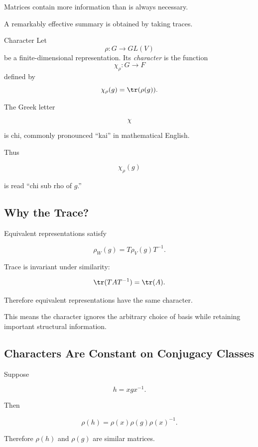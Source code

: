 Matrices contain more information than is always necessary.

A remarkably effective summary is obtained by taking traces.

\begin{definitionbox}{Character}
Let
\[ \rho:G\to GL(V) \]
be a finite-dimensional representation. Its \emph{character} is the function
\[ \chi_\rho:G\to F \]
defined by
\[ \chi_\rho(g)=\tr(\rho(g)). \]
\end{definitionbox}

The Greek letter

\[ \chi \]

is chi, commonly pronounced ``kai'' in mathematical English.

Thus

\[ \chi_\rho(g) \]

is read ``chi sub rho of \(g\).''

\subsection{Why the Trace?}
\label{subsec:why-character-trace}

Equivalent representations satisfy

\[ \rho_W(g)=T\rho_V(g)T^{-1}. \]

Trace is invariant under similarity:

\[ \tr(TAT^{-1})=\tr(A). \]

Therefore equivalent representations have the same character.

This means the character ignores the arbitrary choice of basis while
retaining important structural information.

\subsection{Characters Are Constant on Conjugacy Classes}
\label{subsec:characters-conjugacy}

Suppose

\[ h=xgx^{-1}. \]

Then

\[ \rho(h)=\rho(x)\rho(g)\rho(x)^{-1}. \]

Therefore \(\rho(h)\) and \(\rho(g)\) are similar matrices.

